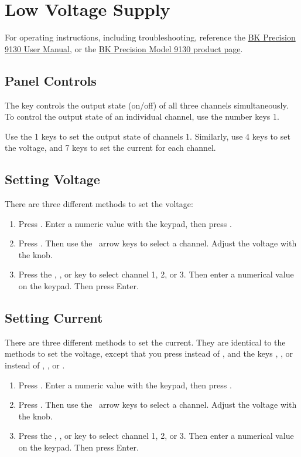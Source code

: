 \chapter{Low Voltage Supply}
\label{sec:op_low_voltage}

For operating instructions, including troubleshooting, reference the \href{Manuals/9130_manual.pdf}{BK Precision 9130 User Manual}, or the \href{http://www.bkprecision.com/products/model/9130/triple-output-programmable-dc-power-supply.html}{BK Precision Model 9130 product page}.

\section{Panel Controls}
\label{sec:op_low_voltage:panel_controls}

The  key controls the output state (on/off) of all three channels simultaneously.  To control the output state of an individual channel, use the number keys 1.

Use the 1 keys to set the output state of channels 1.  Similarly, use 4 keys to set the voltage, and 7 keys to set the current for each channel.

\section{Setting Voltage}
\label{sec:op_low_voltage:set_voltage}
There are three different methods to set the voltage:
\begin{enumerate}
\item Press .  Enter a numeric value with the keypad, then press .
\item Press .  Then use the \upkey\downkey\ arrow keys to select a channel.  Adjust the voltage with the knob.
\item Press the , , or  key to select channel 1, 2, or 3.  Then enter a numerical value on the keypad.  Then press Enter.
\end{enumerate}

\section{Setting Current}
\label{sec:op_low_voltage:set_current}
There are three different methods to set the current.  They are identical to the methods to set the voltage, except that you press  instead of , and the keys , , or  instead of , , or .
\begin{enumerate}
\item Press .  Enter a numeric value with the keypad, then press .
\item Press .  Then use the \upkey\downkey\ arrow keys to select a channel.  Adjust the voltage with the knob.
\item Press the , , or  key to select channel 1, 2, or 3.  Then enter a numerical value on the keypad.  Then press Enter.
\end{enumerate}

